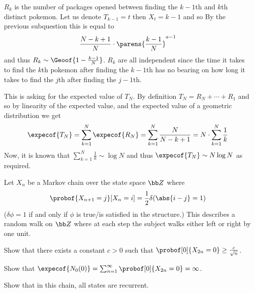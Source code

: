     \item $R_k$ is the number of packages opened between finding the $k-1$th and $k$th distinct pokemon.
    Let us denote $T_{k-1}=t$ then $X_t=k-1$ and so
    By the previous subquestion this is equal to
    $$ \frac{N-k+1}N\cdot\parens{\frac{k-1}N}^{a-1} $$
    and thus $R_k\sim\Geoof{1-\frac{k-1}N}$.
    $R_k$ are all independent since the time it takes to find the $k$th pokemon after finding the $k-1$th has no bearing on how long it takes to find the $j$th after finding the $j-1$th.

    \item This is asking for the expected value of $T_N$.
    By definition $T_N=R_N+\cdots+R_1$ and so by linearity of the expected value, and the expected value of a geometric distribution we get
    $$ \expecof{T_N} = \sum_{k=1}^N\expecof{R_N} = \sum_{k=1}^N\frac N{N-k+1} = N\cdot\sum_{k=1}^N\frac1k $$
    Now, it is known that $\sum_{k=1}^N\frac1k\sim\log N$ and thus $\expecof{T_N}\sim N\log N$ as required.
\eenum

\bexerc

    Let $X_n$ be a Markov chain over the state space ${\bb Z}$ where
    $$ \probof{X_{n+1}=j}[X_n=i] = \frac12\delta(\abs{i-j}=1) $$
    ($\delta\phi=1$ if and only if $\phi$ is true/is satisfied in the structure.)
    This describes a random walk on ${\bb Z}$ where at each step the subject walks either left or right by one unit.
    \benum
        \item Show that there exists a constant $c>0$ such that $\probof[0]{X_{2n}=0}\geq\frac c{\sqrt n}$.
        \item Show that $\expecof{N_0(0)}=\sum_{n=1}^\infty\probof[0]{X_{2n}=0}=\infty$.
        \item Show that in this chain, all states are recurrent.
    \eenum

\eexerc

